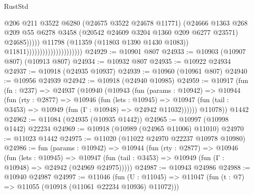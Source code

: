 \begin{lexlean}{RustStd}
\begin{coremodule}
{{{{{{{{{{{{{{{{{{{                                                      @206
                                                      @211
                                                      @3522
                                                      @6280
                                                      (@24675 @3522 @24678 @11771)
                                                      (@24666
                                                        @1363
                                                        @268
                                                        @209
                                                        @55
                                                        @6278
                                                        @3458
                                                        (@20542
                                                          @24609
                                                          @3204
                                                          @1360
                                                          @209
                                                          @6277
                                                          @23571)
                                                        @24685)))))
                                              @11798
                                              (@11359 (@11803 @1390 @1430 @1083))
                                              @11811)))))))))))))))))))))
@24929 := @10901 @807
@24933 := @10903 (@10907 @807) (@10913 @807)
@24934 := @10932 @807
@24935 := @10922 @24934
@24937 := @10918 (@24935 @10937)
@24939 := @10960 (@10961 @807)
@24940 := @10956 @24939
@24942 := @10918 (@24940 @10985)
@24959 := @10917
    (fun (fn : @237) =>
    @24937
      (@10940
        (@10943
          (fun (params : @10942) =>
          @10944
            (fun (rty : @2877) =>
            @10946
              (fun (lets : @10945) =>
              @10947 (fun (tail : @3453) => @10949 (fun (Γ : @10948) => @24942 @11032))))))
        @11078))
    @1442
@24962 := @11084 (@24935 (@10935 @1442))
@24965 := @10997 (@10998 @1442) @22234
@24969 := @10918 (@10989 (@24965 @11006) @11010)
@24970 := @11023 @1442
@24975 := @11020 (@11022 @24970 @22237 @10978 @10980)
@24986 := fun (params : @10942) =>
  @10944
    (fun (rty : @2877) =>
    @10946
      (fun (lets : @10945) =>
      @10947 (fun (tail : @3453) => @10949 (fun (Γ : @10948) => @24942 (@24969 @24975)))))
@24987 := @10943 @24986
@24988 := @10940 @24987
@24997 := @11046
    (fun (U : @11045) => @11047 (fun (t : @7) => @11055 (@10918 (@11061 @22234 @10936) @11072)))
}}}}}}}}}}}}}}}}}}}
\end{coremodule}
\end{lexlean}
